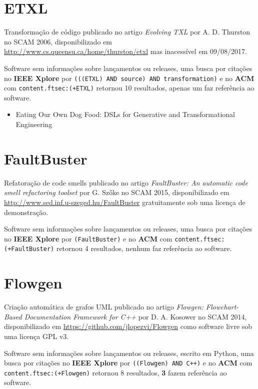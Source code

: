 \section{ETXL}

Transformação de código
publicado no artigo {\it Evolving TXL}
por A. D. Thurston
no SCAM 2006,
disponibilizado em \url{http://www.cs.queensu.ca/home/thurston/etxl}
mas inacessível em 09/08/2017.

Software sem informações sobre lançamentos ou releases,
uma busca por citações no {\bf IEEE Xplore} por
\texttt{(((ETXL) AND source) AND transformation)}
e no {\bf ACM} com
\texttt{content.ftsec:(+ETXL)}
retornou
10 resultados,
apenas um faz referência ao software.

\begin{itemize}
\item Eating Our Own Dog Food: DSLs for Generative and Transformational Engineering
\end{itemize}


\section{FaultBuster}

Refatoração de code smells
publicado no artigo {\it FaultBuster: An automatic code smell refactoring toolset}
por G. Szőke
no SCAM 2015,
disponibilizado em \url{http://www.sed.inf.u-szeged.hu/FaultBuster}
gratuitamente
sob uma licença de demonstração.

Software sem informações sobre lançamentos ou releases,
uma busca por citações no {\bf IEEE Xplore} por
\texttt{(FaultBuster)}
e no {\bf ACM} com
\texttt{content.ftsec:(+FaultBuster)}
retornou
4 resultados,
nenhum faz referência ao software.



\section{Flowgen}

Criação automática de grafos UML
publicado no artigo {\it Flowgen: Flowchart-Based Documentation Framework for C++}
por D. A. Kosower
no SCAM 2014,
disponibilizado em \url{https://github.com/jlopezvi/Flowgen}
como software livre
sob uma licença GPL v3.

Software sem informações sobre lançamentos ou releases,
escrito em Python,
uma busca por citações no {\bf IEEE Xplore} por
\texttt{((Flowgen) AND C++)}
e no {\bf ACM} com
\texttt{content.ftsec:(+Flowgen)}
retornou
8 resultados,
{\bf 3} fazem referência ao software.

